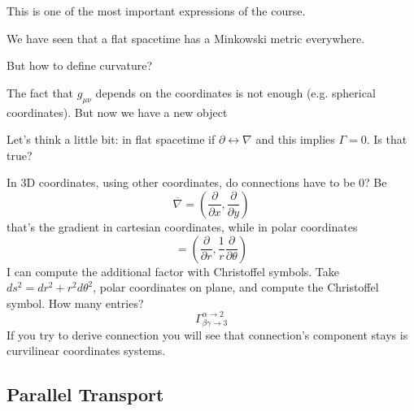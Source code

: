  This is one of the most important expressions of the course. \par
 We have seen that a flat spacetime has a Minkowski metric everywhere. \par
 But how to define curvature? \par
 The fact that $g_{\mu \nu }$ depends on the coordinates is not enough (e.g. spherical coordinates). But now we have a new object\par
 Let's think a little bit: in flat spacetime if $\partial \leftrightarrow \nabla $ and this implies $\Gamma  = 0$. Is that true? \par
 
 In 3D coordinates, using other coordinates, do connections have to be 0? Be
 \[
 \overline{\nabla } = \left( \frac{\partial }{\partial x} , \frac{\partial }{\partial y}  \right)
 \]
 that's the gradient in cartesian coordinates, while in polar coordinates
 \[
 = \left( \frac{\partial }{\partial r} , \frac{1}{r} \frac{\partial }{\partial \theta }  \right)
 \]
 I can compute the additional factor with Christoffel symbols.
 Take $ds^{2} = dr^{2} + r^{2}d\theta ^{2}$, polar coordinates on plane, and compute the Christoffel symbol. How many entries?
 \[
 \Gamma ^{\alpha \to 2}_{\beta \gamma \to 3} 
 \]
If you try to derive connection you will see that connection's component stays is curvilinear coordinates systems.

 \subsection{Parallel Transport}
 



